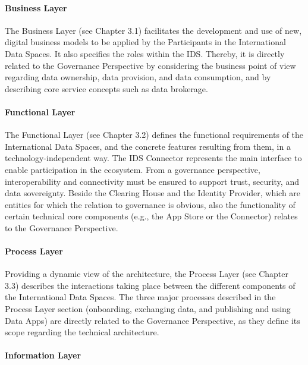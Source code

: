 \paragraph{Business Layer\\}

The Business Layer (see Chapter 3.1) facilitates the development and use of new, digital business models to be applied by the Participants in the International Data Spaces. It also specifies the roles within the IDS. Thereby, it is directly related to the Governance Perspective by considering the business point of view regarding data ownership, data provision, and data consumption, and by describing core service concepts such as data brokerage.

\paragraph{Functional Layer\\}

The Functional Layer (see Chapter 3.2) defines the functional requirements of the International Data Spaces, and the concrete features resulting from them, in a technology-independent way. The IDS Connector represents the main interface to enable participation in the ecosystem. From a governance perspective, interoperability and connectivity must be ensured to support trust, security, and data sovereignty. Beside the Clearing House and the Identity Provider, which are entities for which the relation to governance is obvious, also the functionality of certain technical core components (e.g., the App Store or the Connector) relates to the Governance Perspective.

\paragraph{Process Layer\\}

Providing a dynamic view of the architecture, the Process Layer (see Chapter 3.3) describes the interactions taking place between the different components of the International Data Spaces. The three major processes described in the Process Layer section (onboarding, exchanging data, and publishing and using Data Apps) are directly related to the Governance Perspective, as they define its scope regarding the technical architecture.

\paragraph{Information Layer\\}

